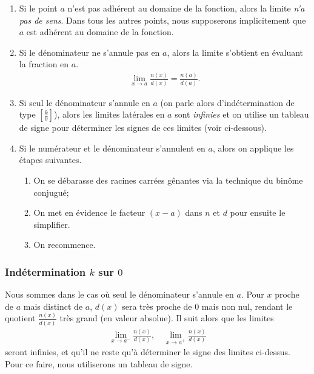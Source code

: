 \documentclass[main.tex]{subfiles}
\begin{document}
\begin{enumerate}
    \item Si le point $a$ n'est pas adhérent au domaine de la fonction, alors la limite \emph{n'a pas de sens}.
        Dans tous les autres points, nous supposerons implicitement que $a$ est adhérent au domaine de la fonction.
    \item Si le dénominateur ne s'annule pas en $a$,
        alors la limite s'obtient en évaluant la fraction en $a$.
        \begin{align}
            \lim_{x \to a} \frac {n(x)} {d(x)} = \frac {n(a)} {d(a)}.
        \end{align}
    \item Si seul le dénominateur s'annule en $a$
        (on parle alors d'indétermination de type $\left[\frac k 0\right]$),
        alors les limites latérales en $a$ sont \emph{infinies}
        et on utilise un tableau de signe pour déterminer les signes de ces limites
        (voir ci-dessous).
    \item Si le numérateur et le dénominateur s'annulent en $a$,
        alors on applique les étapes suivantes.
        \begin{enumerate}
            \item On se débarasse des racines carrées gênantes via la technique du binôme conjugué;
            \item On met en évidence le facteur $(x - a)$ dans $n$ et $d$ pour ensuite le simplifier.
            \item On recommence.
        \end{enumerate}
\end{enumerate}

\subsubsection{Indétermination $k$ sur $0$}

Nous sommes dans le cas où seul le dénominateur s'annule en $a$.
Pour $x$ proche de $a$ mais distinct de $a$,
$d(x)$ sera très proche de $0$ mais non nul,
rendant le quotient $\frac {n(x)} {d(x)}$ très grand (en valeur absolue).
Il suit alors que les limites
\begin{align}
    \lim_{x \to a^-} \frac {n(x)} {d(x)},
    \quad
    \lim_{x \to a^+} \frac {n(x)} {d(x)}
\end{align}
seront infinies,
et qu'il ne reste qu'à déterminer le signe des limites ci-dessus.
Pour ce faire,
nous utiliserons un tableau de signe.
\end{document}
